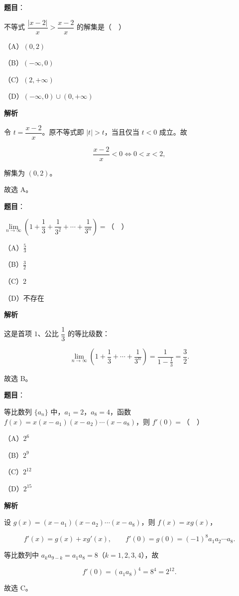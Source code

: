 \begin{answer}

\textbf{题目}：

不等式 $\dfrac{|x-2|}{x}>\dfrac{x-2}{x}$ 的解集是（　）

（A）$(0,2)$

（B）$(-\infty,0)$

（C）$(2,+\infty)$

（D）$(-\infty,0)\cup(0,+\infty)$

\textbf{解析}

令 $t=\dfrac{x-2}{x}$。原不等式即 $|t|>t$，当且仅当 $t<0$ 成立。故

\nopagebreak[4]
\[\frac{x-2}{x}<0\iff 0<x<2,\]

解集为 $(0,2)$。

故选 A。


\end{answer}
\begin{answer}

\textbf{题目}：

$\lim\limits_{n\to\infty}\left(1+\dfrac13+\dfrac1{3^2}+\cdots+\dfrac1{3^n}\right)=$（　）

（A）$\frac53$

（B）$\frac32$

（C）$2$

（D）不存在

\textbf{解析}

这是首项 $1$、公比 $\dfrac13$ 的等比级数：

\nopagebreak[4]
\[\lim_{n\to\infty}\left(1+\frac13+\cdots+\frac1{3^n}\right)
=\frac1{1-\frac13}=\frac32.\]

故选 B。


\end{answer}
\begin{answer}

\textbf{题目}：

等比数列 $\{a_n\}$ 中，$a_1=2$，$a_8=4$，函数 $f(x)=x(x-a_1)(x-a_2)\cdots(x-a_8)$，则 $f'(0)=$（　）

（A）$2^6$

（B）$2^9$

（C）$2^{12}$

（D）$2^{15}$

\textbf{解析}

设 $g(x)=(x-a_1)(x-a_2)\cdots(x-a_8)$，则 $f(x)=xg(x)$，

\nopagebreak[4]
\[f'(x)=g(x)+xg'(x),\qquad f'(0)=g(0)=(-1)^8a_1a_2\cdots a_8.\]

等比数列中 $a_ka_{9-k}=a_1a_8=8$（$k=1,2,3,4$），故

\nopagebreak[4]
\[f'(0)=(a_1a_8)^4=8^4=2^{12}.\]

故选 C。


\end{answer}
